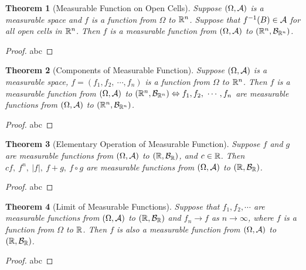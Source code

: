 \documentclass[openany,12pt]{book}
\newtheorem{theorem}{Theorem}[chapter]
\begin{document}
\begin{theorem}[Measurable Function on Open Cells]
Suppose $(\Omega,\mathcal{A})$ is a measurable space and $f$ is a function from $\Omega$ to $\mathbb{R}^n$. Suppose that $f^{-1}(B)\in\mathcal{A}$ for all open cells in $\mathbb{R}^n$. Then $f$ is a measurable function from $(\Omega,\mathcal{A})$ to $(\mathbb{R}^n,\mathcal{B}_{\mathbb{R}^n})$.
\end{theorem}

\begin{proof}
  abc
\end{proof}

\begin{theorem}[Components of Measurable Function]
Suppose $(\Omega,\mathcal{A})$ is a measurable space,  $f=(f_1,f_2,\ \cdots,f_n )$  is a function from $\Omega$ to $\mathbb{R}^n$. Then $f$ is a measurable function from  $(\Omega,\mathcal{A})$ to $(\mr^n,\mb_{\mr^n})\Leftrightarrow f_1,f_2,\ \cdots,f_n$ are measurable functions from $(\Omega,\mathcal{A})$ to $(\mathbb{R}^n,\mathcal{B}_{\mathbb{R}^n})$.
\end{theorem}

\begin{proof}
  abc
\end{proof}

\begin{theorem}[Elementary Operation of Measurable Function]
Suppose $f$ and $g$ are measurable functions from $(\Omega,\mathcal{A})$ to $(\mathbb{R},\mathcal{B}_{\mathbb{R}})$, and $c\in\mathbb{R}$. Then $cf,\ f^n,\ |f|,\ f+g,\ f\circ g$ are measurable functions from $(\Omega,\mathcal{A})$ to $(\mathbb{R},\mathcal{B}_{\mathbb{R}})$.
\end{theorem}

\begin{proof}
  abc
\end{proof}

\begin{theorem}[Limit of Measurable Functions]
Suppose that $f_1,f_2,\cdots$ are measurable functions from $(\Omega,\mathcal{A})$ to $(\mathbb{R},\mathcal{B}_{\mathbb{R}})$ and $f_n\to f$ as $n\to\infty$, where $f$ is a function from $\Omega$ to $\mathbb{R}$. Then $f$ is also a measurable function from $(\Omega,\mathcal{A})$ to $(\mathbb{R},\mathcal{B}_{\mathbb{R}})$.
\end{theorem}

\begin{proof}
  abc
\end{proof}
\end{document}
